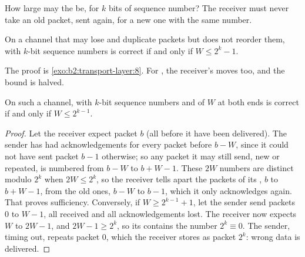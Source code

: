 \label{lst:b2:transport-layer:sr}


How large may the  be, for $k$ bits of sequence number? The receiver must never take an old packet, sent again,
for a new one with the same number.

\begin{proposition}\label{prop:b2:transport-layer:gbn-window}
On a channel that may lose and duplicate packets but does not reorder them,  with $k$-bit sequence numbers
is correct if and only if $W \le 2^k - 1$.
\end{proposition}

The proof is \cref{exo:b2:transport-layer:8}. For , the receiver's  moves too, and the bound is
halved.

\begin{theorem}\label{thm:b2:transport-layer:sr-window}
On such a channel,  with $k$-bit sequence numbers and  of $W$ at both ends is correct if and
only if $W \le 2^{k-1}$.
\end{theorem}

\begin{proof}
Let the receiver expect packet $b$ (all before it have been delivered). The sender has had acknowledgements for every
packet before $b - W$, since it could not have sent packet $b - 1$ otherwise; so any packet it may still send, new
or repeated, is numbered from $b - W$ to $b + W - 1$. These $2W$ numbers are distinct modulo $2^k$ when $2W \le 2^k$,
so the receiver tells apart the packets of its , $b$ to $b + W - 1$, from the old ones, $b - W$ to $b - 1$, which
it only acknowledges again. That proves sufficiency. Conversely, if $W \ge 2^{k-1} + 1$, let the sender send packets
$0$ to $W - 1$, all received and all acknowledgements lost. The receiver now expects $W$ to $2W - 1$, and $2W - 1 \ge
2^k$, so its  contains the number $2^k \equiv 0$. The sender, timing out, repeats packet 0, which the receiver
stores as packet $2^k$: wrong data is delivered.
\end{proof}

